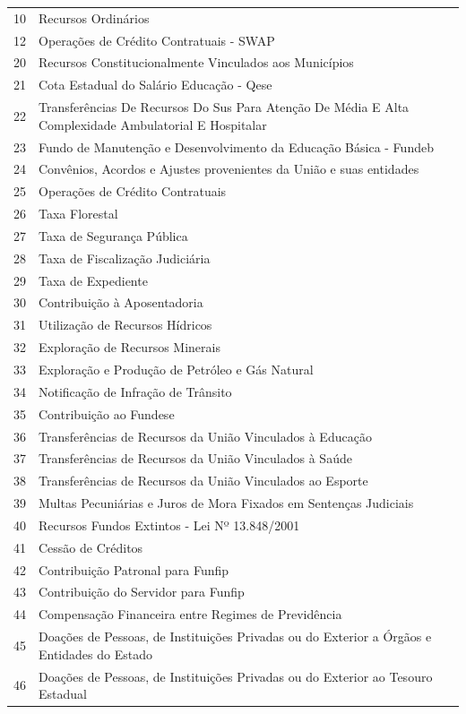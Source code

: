 \documentclass{article} %
\begin{document}
\begin{longtable}[c]{m{1cm}|m{11cm}}
10 & Recursos Ordinários \\
12 & Operações de Crédito Contratuais - SWAP \\
20 & Recursos Constitucionalmente Vinculados aos Municípios \\
21 & Cota Estadual do Salário Educação - Qese \\
22 & Transferências De Recursos Do Sus Para Atenção De Média E Alta Complexidade Ambulatorial E Hospitalar \\
23 & Fundo de Manutenção e Desenvolvimento da Educação Básica - Fundeb \\
24 & Convênios, Acordos e Ajustes provenientes da União e suas entidades \\
25 & Operações de Crédito Contratuais \\
26 & Taxa Florestal \\
27 & Taxa de Segurança Pública \\
28 & Taxa de Fiscalização Judiciária \\
29 & Taxa de Expediente \\
30 & Contribuição à Aposentadoria \\
31 & Utilização de Recursos Hídricos \\
32 & Exploração de Recursos Minerais \\
33 & Exploração e Produção de Petróleo e Gás Natural \\
34 & Notificação de Infração de Trânsito \\
35 & Contribuição ao Fundese \\
36 & Transferências de Recursos da União Vinculados à Educação \\
37 & Transferências de Recursos da União Vinculados à Saúde \\
38 & Transferências de Recursos da União Vinculados ao Esporte \\
39 & Multas Pecuniárias e Juros de Mora Fixados em Sentenças Judiciais \\
40 & Recursos Fundos Extintos - Lei Nº 13.848/2001 \\
41 & Cessão de Créditos \\
42 & Contribuição Patronal para Funfip \\
43 & Contribuição do Servidor para Funfip \\
44 & Compensação Financeira entre Regimes de Previdência \\
45 & Doações de Pessoas, de Instituições Privadas ou do Exterior a Órgãos e Entidades do Estado \\
46 & Doações de Pessoas, de Instituições Privadas ou do Exterior ao Tesouro Estadual \\

\end{longtable}
\end{document}
